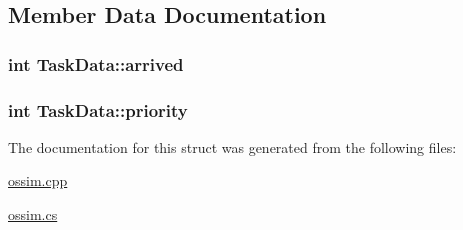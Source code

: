 \subsection{Member Data Documentation}
\hypertarget{struct_task_data_a126fafee3369b6a2d8734f4e46c670bc}{
\subsubsection[{arrived}]{\setlength{\rightskip}{0pt plus 5cm}int Task\-Data\-::arrived}}\label{struct_task_data_a126fafee3369b6a2d8734f4e46c670bc}
\hypertarget{struct_task_data_a9d8b606897eb428a62d816b71312e1b7}{
\subsubsection[{priority}]{\setlength{\rightskip}{0pt plus 5cm}int Task\-Data\-::priority}}\label{struct_task_data_a9d8b606897eb428a62d816b71312e1b7}


The documentation for this struct was generated from the following files\-:\begin{DoxyCompactItemize}
\item 
\hyperlink{ossim_8cpp}{ossim.\-cpp}\item 
\hyperlink{ossim_8cs}{ossim.\-cs}\end{DoxyCompactItemize}
